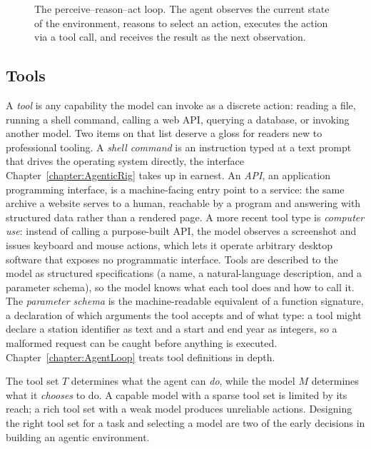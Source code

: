 \begin{figure}[htb!]
\begin{center}

\caption{The perceive--reason--act loop.
The agent observes the current state of the environment, reasons to select an action, executes the action via a tool call, and receives the result as the next observation.}
\label{figure:AgentLoop}
\end{center}
\end{figure}

\subsection{Tools}

A \emph{tool} is any capability the model can invoke as a discrete action: reading a file, running a shell command, calling a web API, querying a database, or invoking another model.
Two items on that list deserve a gloss for readers new to professional tooling.
A \emph{shell command} is an instruction typed at a text prompt that drives the operating system directly, the interface Chapter~\ref{chapter:AgenticRig} takes up in earnest.
An \emph{API}, an application programming interface, is a machine-facing entry point to a service: the same archive a website serves to a human, reachable by a program and answering with structured data rather than a rendered page.
A more recent tool type is \emph{computer use}: instead of calling a purpose-built API, the model observes a screenshot and issues keyboard and mouse actions, which lets it operate arbitrary desktop software that exposes no programmatic interface.
Tools are described to the model as structured specifications (a name, a natural-language description, and a parameter schema), so the model knows what each tool does and how to call it.
The \emph{parameter schema} is the machine-readable equivalent of a function signature, a declaration of which arguments the tool accepts and of what type: a  tool might declare a station identifier as text and a start and end year as integers, so a malformed request can be caught before anything is executed.
Chapter~\ref{chapter:AgentLoop} treats tool definitions in depth.

The tool set $T$ determines what the agent can \emph{do}, while the model $M$ determines what it \emph{chooses} to do.
A capable model with a sparse tool set is limited by its reach; a rich tool set with a weak model produces unreliable actions.
Designing the right tool set for a task and selecting a model are two of the early decisions in building an agentic environment.

